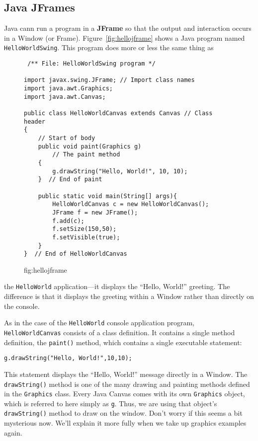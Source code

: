\subsection{Java JFrames}

Java cann run a program in a {\bf JFrame} so that the output 
and interaction occurs in a Window (or Frame). Figure~\ref{fig:hellojframe} shows a Java program named {\tt
HelloWorldSwing}. This program does more or less the same thing as
\begin{figure}[h!]
\jjjprogstart
\begin{jjjlisting}
\begin{lstlisting}
 /** File: HelloWorldSwing program */

import javax.swing.JFrame; // Import class names
import java.awt.Graphics;
import java.awt.Canvas;

public class HelloWorldCanvas extends Canvas // Class header
{                                            
    // Start of body
    public void paint(Graphics g)           
        // The paint method
    {
        g.drawString("Hello, World!", 10, 10);
    }  // End of paint

    public static void main(String[] args){
        HelloWorldCanvas c = new HelloWorldCanvas();
        JFrame f = new JFrame();
        f.add(c);
        f.setSize(150,50);
        f.setVisible(true);
    }
}  // End of HelloWorldCanvas

\end{lstlisting}
\end{jjjlisting}
{fig:hellojframe}
\end{figure}
the {\tt HelloWorld} application---it displays the ``Hello, World!'' 
greeting. The difference is that it displays the greeting within
a Window rather than directly on the console. 

As in the case of the {\tt HelloWorld} console application program, {\tt
Hello\-World\-Canvas} consists of a class definition.  It contains a
single method definition, the {\tt paint()} method, which
contains a single executable statement:

\begin{jjjlisting}
\begin{lstlisting}
g.drawString("Hello, World!",10,10);
\end{lstlisting}
\end{jjjlisting}

\noindent This statement displays the ``Hello, World!'' message
directly in a Window. 
The {\tt drawString()} method is one of the many
drawing and painting methods defined in the {\tt Graphics} class.
Every Java Canvas comes with its own {\tt Graphics} object, which is
referred to here simply as {\tt g}. Thus, we are using that object's
{\tt drawString()} method to draw on the window. Don't worry
if this seems a bit mysterious now. We'll explain it more fully when
we take up graphics examples again.


